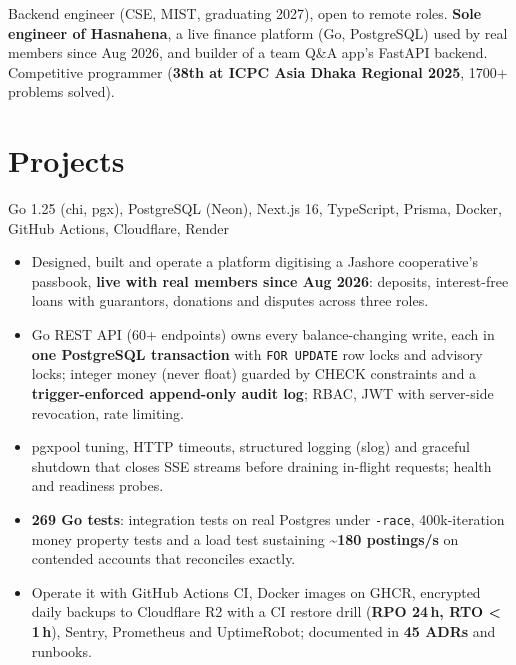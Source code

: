 \documentclass[10pt,a4paper]{article}
\begin{document}

Backend engineer (CSE, MIST, graduating 2027), open to remote roles. \textbf{Sole engineer of Hasnahena}, a live
finance platform (Go, PostgreSQL) used by real members since Aug 2026, and builder of a team Q\&A app's FastAPI backend.
Competitive programmer (\textbf{38th at ICPC Asia Dhaka Regional 2025}, 1700+ problems solved).

\vspace{6pt}

\section{Projects}
{ \textbar{} }
{Go 1.25 (chi, pgx), PostgreSQL (Neon), Next.js 16, TypeScript, Prisma, Docker, GitHub Actions, Cloudflare, Render}
{\begin{itemize}
  \item Designed, built and operate a platform digitising a Jashore cooperative's passbook, \textbf{live with real members since Aug 2026}: deposits, interest-free loans with guarantors, donations and disputes across three roles.
  \item Go REST API (60+ endpoints) owns every balance-changing write, each in \textbf{one PostgreSQL transaction} with \texttt{FOR~UPDATE} row locks and advisory locks; integer money (never float) guarded by CHECK constraints and a \textbf{trigger-enforced append-only audit log}; RBAC, JWT with server-side revocation, rate limiting.
  \item pgxpool tuning, HTTP timeouts, structured logging (slog) and graceful shutdown that closes SSE streams before draining in-flight requests; health and readiness probes.
  \item \textbf{269 Go tests}: integration tests on real Postgres under \texttt{-race}, 400k-iteration money property tests and a load test sustaining \textbf{\textasciitilde180 postings/s} on contended accounts that reconciles exactly.
  \item Operate it with GitHub Actions CI, Docker images on GHCR, encrypted daily backups to Cloudflare R2 with a CI restore drill (\textbf{RPO 24\,h, RTO \textless{} 1\,h}), Sentry, Prometheus and UptimeRobot; documented in \textbf{45 ADRs} and runbooks.
\end{itemize}}






\end{document}
